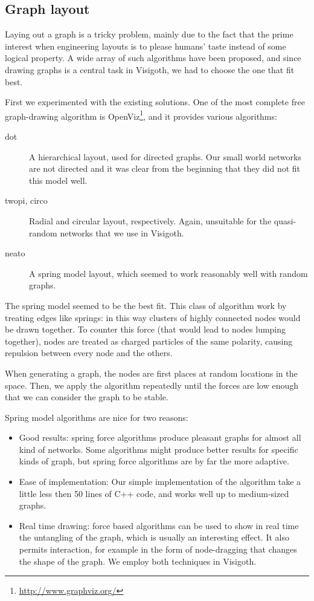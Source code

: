 \documentclass[a4paper,11pt,titlepage]{article}
\begin{document}
\subsection{Graph layout}
Laying out a graph is a tricky problem, mainly due to the fact that the
prime interest when engineering layouts is to please humans' taste
instead of some logical property. A wide array of such algorithms have
been proposed, and since drawing graphs is a central task in Visigoth,
we had to choose the one that fit best.

First we experimented with the existing solutions. One of the most
complete free graph-drawing algorithm is
OpenViz\footnote{\url{http://www.graphviz.org/}}, and it provides
various algorithms:

\begin{description}
\item [dot] A hierarchical layout, used for directed graphs. Our small
  world networks are not directed and it was clear from the beginning
  that they did not fit this model well.

\item [twopi, circo] Radial and circular layout, respectively. Again,
  unsuitable for the quasi-random networks that we use in Visigoth.

\item [neato] A spring model layout, which seemed to work reasonably
  well with random graphs.
\end{description}

The spring model seemed to be the best fit. This class of algorithm
work by treating edges like springs: in this way clusters of highly
connected nodes would be drawn together. To counter this force (that
would lead to nodes lumping together), nodes are treated as charged
particles of the same polarity, causing repulsion between every node
and the others.

When generating a graph, the nodes are first places at random
locations in the space. Then, we apply the algorithm repeatedly until
the forces are low enough that we can consider the graph to be stable.

Spring model algorithms are nice for two reasons:

\begin{itemize}
\item Good results: spring force algorithms produce pleasant graphs
  for almost all kind of networks. Some algorithms might produce
  better results for specific kinds of graph, but spring force
  algorithms are by far the more adaptive.

\item Ease of implementation: Our simple implementation of the
  algorithm take a little less then 50 lines of C++ code, and works
  well up to medium-sized graphs.

\item Real time drawing: force based algorithms can be used to show in
  real time the untangling of the graph, which is usually an
  interesting effect. It also permits interaction, for example in the
  form of node-dragging that changes the shape of the graph. We employ
  both techniques in Visigoth.
\end{itemize}
\end{document}
